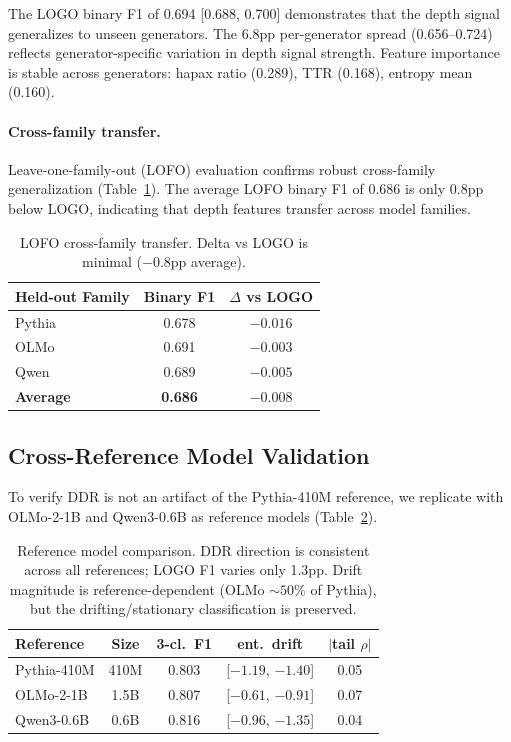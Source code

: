 \documentclass[11pt,a4paper]{article}
\begin{document}
The LOGO binary F1 of 0.694 [0.688, 0.700] demonstrates that the depth signal generalizes to unseen generators. The 6.8pp per-generator spread (0.656--0.724) reflects generator-specific variation in depth signal strength. Feature importance is stable across generators: hapax ratio (0.289), TTR (0.168), entropy mean (0.160).

\paragraph{Cross-family transfer.} Leave-one-family-out (LOFO) evaluation confirms robust cross-family generalization (Table~\ref{tab:lofo}). The average LOFO binary F1 of 0.686 is only 0.8pp below LOGO, indicating that depth features transfer across model families.

\begin{table}[t]
\centering
\small
\begin{tabular}{lcc}
\toprule
\textbf{Held-out Family} & \textbf{Binary F1} & \textbf{$\Delta$ vs LOGO} \\
\midrule
Pythia & 0.678 & $-0.016$ \\
OLMo & 0.691 & $-0.003$ \\
Qwen & 0.689 & $-0.005$ \\
\midrule
\textbf{Average} & \textbf{0.686} & $-0.008$ \\
\bottomrule
\end{tabular}
\caption{LOFO cross-family transfer. Delta vs LOGO is minimal ($-0.8$pp average).}
\label{tab:lofo}
\end{table}

\subsection{Cross-Reference Model Validation}
\label{sec:cross_ref}

To verify DDR is not an artifact of the Pythia-410M reference, we replicate with OLMo-2-1B and Qwen3-0.6B as reference models (Table~\ref{tab:ref_model}).

\begin{table}[t]
\centering
\small
\begin{tabular}{lcccc}
\toprule
\textbf{Reference} & \textbf{Size} & \textbf{3-cl.~F1} & \textbf{ent.~drift} & \textbf{$|$tail $\rho|$} \\
\midrule
Pythia-410M & 410M & 0.803 & [$-1.19$, $-1.40$] & 0.05 \\
OLMo-2-1B & 1.5B & 0.807 & [$-0.61$, $-0.91$] & 0.07 \\
Qwen3-0.6B & 0.6B & 0.816 & [$-0.96$, $-1.35$] & 0.04 \\
\bottomrule
\end{tabular}
\caption{Reference model comparison. DDR direction is consistent across all references; LOGO F1 varies only 1.3pp. Drift magnitude is reference-dependent (OLMo ${\sim}50\%$ of Pythia), but the drifting/stationary classification is preserved.}
\label{tab:ref_model}
\end{table}
\end{document}
